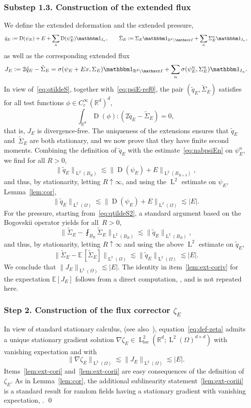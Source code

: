 \documentclass[JEP,XML,SOM,Unicode,published]{cedram}
\let\mathcal\mathscr
\let\mathds\mathbbm
\theoremstyle{plain}
\theoremstyle{definition}
\newcommand{\R}{\mathbb R}
\newcommand{\Ic}{\mathcal I}
\newcommand{\loc}{{\operatorname{loc}}}
\newcommand{\D}{\operatorname{D}}
\newcommand{\Ld}{\operatorname{L}}
\newcommand{\step}[1]{\subsubsection*{Step #1}}
\newcommand{\substep}[1]{\subsubsection*{Substep #1}}
\newcommand{\expec}[1]{\mathbb{E}\left[ #1 \right]}
\newcommand{\expecmm}[1]{\mathbb{E}\,[ #1 ]}
\begin{document}
\substep{1.3. Construction of the extended flux}
We define the extended deformation and the extended pressure,
\[\tilde q_E:=\D(\psi_E)+E+\sum_n\D(\psi_E^n)\mathds1_{I_n},\qquad \tilde\Sigma_E:=\Sigma_E\mathds1_{\R^d\setminus\Ic}+\sum_n \Sigma_E^n\mathds1_{I_n},\]
as well as the corresponding extended flux
\begin{equation}\label{eq:def-J}
J_E:=2\tilde q_E-\tilde\Sigma_E=\sigma(\psi_E+Ex,\Sigma_E)\mathds1_{\R^d\setminus\Ic}+\sum_n\sigma(\psi_E^{n},\Sigma_E^{n})\mathds1_{I_n}.
\end{equation}
In view of~\eqref{eq:qtildeS}, together with~\eqref{eq:psiE-ref0}, the pair $(\tilde q_E,\tilde \Sigma_E)$ satisfies for all test functions $\phi\in C^\infty_c(\R^d)^d$,
\begin{equation}\label{eq:qtildeS2}
\int_{\R^d}\D(\phi):(2\tilde q_E-\tilde\Sigma_E)=0,
\end{equation}
that is, $J_E$ is divergence-free.
The uniqueness of the extensions ensures that $\tilde q_E$ and~$\tilde\Sigma_E$ are both stationary, and we now prove that they have finite second moments.
Combining the definition of $\tilde q_E$ with the estimate~\eqref{eq:nabpsiEn} on $\psi_E^n$, we find for all $R>0$,
\[\|\tilde q_E\|_{\Ld^2(B_R)}\lesssim \|\!\D(\psi_E)+E\|_{\Ld^2(B_{R+3})},\]
and thus, by stationarity, letting $R\uparrow\infty$, and using the $\Ld^2$ estimate on $\psi_E$, \cf Lemma~\ref{lem:cor},
\[\|\tilde q_E\|_{\Ld^2(\Omega)}\lesssim \|\!\D(\psi_E)+E\|_{\Ld^2(\Omega)}\lesssim |E|.\]
For the pressure, starting from~\eqref{eq:qtildeS2}, a standard argument based on the Bogovskii operator yields for all~$R>0$,
\begin{equation*}
\Big\|\tilde\Sigma_E-\fint_{B_R}\tilde\Sigma_E\Big\|_{\Ld^2(B_R)}\lesssim \|\tilde q_E\|_{\Ld^2(B_R)},
\end{equation*}
and thus, by stationarity, letting $R\uparrow\infty$ and using the above $\Ld^2$ estimate on $\tilde q_E$,
\begin{equation*}
\|\tilde\Sigma_E-\expecmm{\tilde\Sigma_E}\|_{\Ld^2(\Omega)}\lesssim \|\tilde q_E\|_{\Ld^2(\Omega)}\lesssim |E|.
\end{equation*}
We conclude that $\|J_E\|_{\Ld^2(\Omega)}\lesssim|E|$.
The identity in item~\eqref{lem:ext-coriv} for the expectation $\expec{J_E}$ follows from a direct computation, \cf \cite[Lem.\,4.2]{D-20}, and is not repeated here.

\step{2. Construction of the flux corrector $\zeta_E$}
In view of standard stationary calculus, \eg \cite[\S 7]{JKO94} (see also~\cite[Proof of Lemma~1]{GNO-reg}),
equation~\eqref{eq:def-zeta} admits a unique stationary gradient solution $\nabla\zeta_{E}\in\Ld^2_\loc(\R^d;\Ld^2(\Omega)^{d\times d})$ with vanishing expectation and with
\[\|\nabla\zeta_E\|_{\Ld^2(\Omega)}\lesssim \|J_E\|_{\Ld^2(\Omega)}\lesssim |E|.\]
Items~\eqref{lem:ext-cori} and~\eqref{lem:ext-corii} are easy consequences of the definition of $\zeta_E$. As in Lemma~\ref{lem:cor}, the additional sublinearity statement~\eqref{lem:ext-coriii} is a standard result for random fields having a stationary gradient with vanishing expectation, \cf \eg \cite[\S 7]{JKO94}.
\qed
\end{document}
